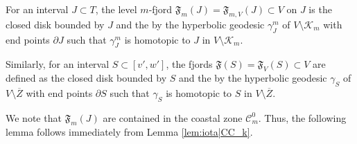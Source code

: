 \documentclass{amsart}
\newcommand{\1}{{\mathbb 1 }}
\theoremstyle{remark}
\numberwithin{equation}{section}
\theoremstyle{definition}
\newcommand{\filled}{{\mathcal {K} }}
\newcommand{\Fjord}{{\mathfrak F}}
\newcommand{\CC}{{\mathcal C}}
\begin{document}
For an interval $J\subset T$, the level $m$-fjord $\Fjord_m(J) = \Fjord_{m, V}(J) \subset V$ on $J$ is the closed disk bounded by $J$ and the by the hyperbolic geodesic $\gamma^m_J$ of $V\setminus\filled_m$ with end points $\partial J$ such that $\gamma^m_J$ is homotopic to $J$ in $V\setminus\filled_m$.

Similarly, for an interval $S\subset [v',w']$, the fjords $\Fjord(S) = \Fjord_V(S)\subset V$ are defined as the closed disk bounded by $S$ and the by the hyperbolic geodesic $\gamma_S$ of $V\setminus\overline{Z}$ with end points $\partial S$ such that $\gamma_S$ is homotopic to $S$ in $V\setminus\overline{Z}$.

We note that $\Fjord_m(J)$ are contained in the coastal zone $\CC^0_m$. Thus, the following lemma follows immediately from Lemma \ref{lem:iota|CC_k}.
\end{document}
